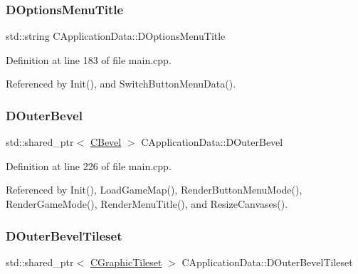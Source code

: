 \hypertarget{classCApplicationData_a1e73e21e92eb68c1cfc0c4bcae8196df}{}\label{classCApplicationData_a1e73e21e92eb68c1cfc0c4bcae8196df} 
\subsubsection{\texorpdfstring{D\+Options\+Menu\+Title}{DOptionsMenuTitle}}
{\footnotesize\ttfamily std\+::string C\+Application\+Data\+::\+D\+Options\+Menu\+Title\hspace{0.3cm}{\ttfamily [protected]}}



Definition at line 183 of file main.\+cpp.



Referenced by Init(), and Switch\+Button\+Menu\+Data().

\hypertarget{classCApplicationData_abc2b04aa05148da81145ff6d6bc2bf01}{}\label{classCApplicationData_abc2b04aa05148da81145ff6d6bc2bf01} 
\subsubsection{\texorpdfstring{D\+Outer\+Bevel}{DOuterBevel}}
{\footnotesize\ttfamily std\+::shared\+\_\+ptr$<$ \hyperlink{classCBevel}{C\+Bevel} $>$ C\+Application\+Data\+::\+D\+Outer\+Bevel\hspace{0.3cm}{\ttfamily [protected]}}



Definition at line 226 of file main.\+cpp.



Referenced by Init(), Load\+Game\+Map(), Render\+Button\+Menu\+Mode(), Render\+Game\+Mode(), Render\+Menu\+Title(), and Resize\+Canvases().

\hypertarget{classCApplicationData_ac1ebf4e2d6c8a445c7e8de643a348093}{}\label{classCApplicationData_ac1ebf4e2d6c8a445c7e8de643a348093} 
\subsubsection{\texorpdfstring{D\+Outer\+Bevel\+Tileset}{DOuterBevelTileset}}
{\footnotesize\ttfamily std\+::shared\+\_\+ptr$<$ \hyperlink{classCGraphicTileset}{C\+Graphic\+Tileset} $>$ C\+Application\+Data\+::\+D\+Outer\+Bevel\+Tileset\hspace{0.3cm}{\ttfamily [protected]}}



